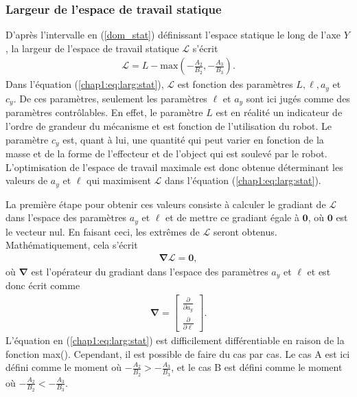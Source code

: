 \subsubsection{Largeur de l'espace de travail statique}
D'après l'intervalle en (\ref{dom_stat}) définissant l'espace statique le long de l'axe $Y$, la largeur de l'espace de travail statique $\mathcal{L}$ s'écrit
\begin{align}
\mathcal{L} = L - \text{max}\left(-\frac{A_2}{B_2},-\frac{A_3}{B_3}\right).
\label{chap1:eq:larg:stat}
\end{align}
Dans l'équation (\ref{chap1:eq:larg:stat}), $\mathcal{L}$ est fonction des paramètres $L,\ell,a_y$ et $c_y$. De ces paramètres, seulement les paramètres $\ell$ et $a_y$ sont ici jugés comme des paramètres contrôlables. En effet, le paramètre $L$ est en réalité un indicateur de l'ordre de grandeur du mécanisme et est fonction de l'utilisation du robot. Le paramètre $c_y$ est, quant à lui, une quantité qui peut varier en fonction de la masse et de la forme de l'effecteur et de l'object qui est soulevé par le robot. L'optimisation de l'espace de travail maximale est donc obtenue déterminant les valeurs de $a_y$ et $\ell$ qui maximisent $\mathcal{L}$ dans l'équation (\ref{chap1:eq:larg:stat}). \par 
La première étape pour obtenir ces valeurs consiste à calculer le gradiant de $\mathcal{L}$ dans l'espace des paramètres $a_y$ et $\ell$ et de mettre ce gradiant égale à $\mathbf{0}$, où $\mathbf{0}$ est le vecteur nul. En faisant ceci, les extrêmes de $\mathcal{L}$ seront obtenus. Mathématiquement, cela s'écrit
\begin{align}
\bm{\nabla} \mathcal{L} = \mathbf{0},
\end{align}
où $\bm{\nabla}$ est l'opérateur du gradiant dans l'espace des paramètres $a_y$ et $\ell$ et est donc écrit comme 
\begin{align}
\bm{\nabla} = 
\begin{bmatrix}
\frac{\partial }{\partial a_y}\\
\frac{\partial }{\partial \ell}
\end{bmatrix}.
\end{align}
L'équation en (\ref{chap1:eq:larg:stat}) est difficilement différentiable en raison de la fonction max(). Cependant, il est possible de faire du cas par cas. Le cas A est ici défini comme le moment où $-\frac{A_2}{B_2}>-\frac{A_3}{B_3}$, et le cas B est défini comme le moment où $-\frac{A_2}{B_2}<-\frac{A_3}{B_3}$. \par

